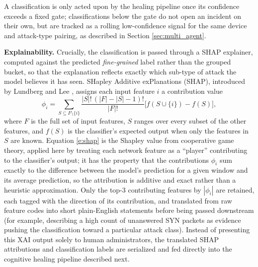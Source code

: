 A classification is only acted upon by the healing pipeline once its confidence exceeds a fixed gate; classifications below the gate do not open an incident on their own, but are tracked as a rolling low-confidence signal for the same device and attack-type pairing, as described in Section \ref{sec:multi_agent}.

\textbf{Explainability.} Crucially, the classification is passed through a SHAP explainer, computed against the predicted \textit{fine-grained} label rather than the grouped bucket, so that the explanation reflects exactly which sub-type of attack the model believes it has seen. SHapley Additive exPlanations (SHAP), introduced by Lundberg and Lee \cite{Lundberg2017}, assigns each input feature $i$ a contribution value
\begin{equation}
\phi_i = \sum_{S \subseteq F \setminus \{i\}} \frac{|S|!\,(|F|-|S|-1)!}{|F|!} \Big[ f(S \cup \{i\}) - f(S) \Big],
\label{e:shap}
\end{equation}
where $F$ is the full set of input features, $S$ ranges over every subset of the other features, and $f(S)$ is the classifier's expected output when only the features in $S$ are known. Equation \ref{e:shap} is the Shapley value from cooperative game theory, applied here by treating each network feature as a ``player'' contributing to the classifier's output; it has the property that the contributions $\phi_i$ sum exactly to the difference between the model's prediction for a given window and its average prediction, so the attribution is additive and exact rather than a heuristic approximation. Only the top-3 contributing features by $|\phi_i|$ are retained, each tagged with the direction of its contribution, and translated from raw feature codes into short plain-English statements before being passed downstream (for example, describing a high count of unanswered SYN packets as evidence pushing the classification toward a particular attack class). Instead of presenting this XAI output solely to human administrators, the translated SHAP attributions and classification labels are serialized and fed directly into the cognitive healing pipeline described next.

